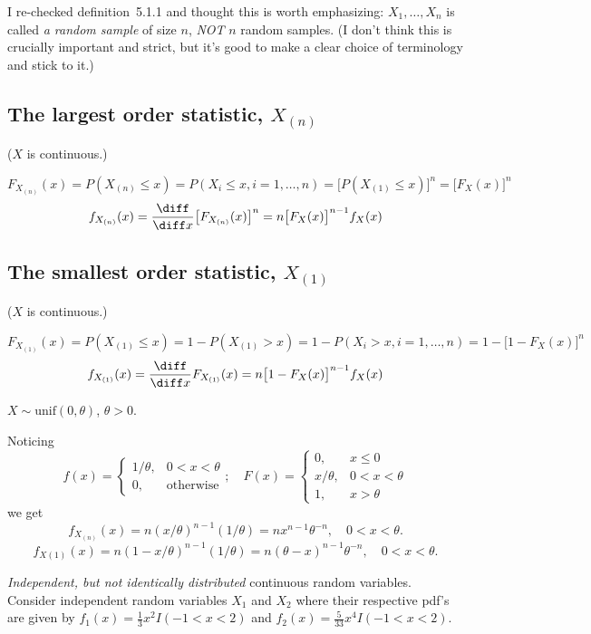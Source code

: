 \documentclass[12pt]{article}
\begin{document}
I re-checked definition~5.1.1 and thought this is worth emphasizing:
$X_1,\dotsc,X_n$ is called \emph{a random sample} of size $n$, \emph{NOT}
$n$ random samples. (I don't think this is crucially important and
strict, but it's good to make a clear choice of terminology and stick to
it.)


\subsection*{The largest order statistic, $X_{(n)}$}

($X$ is continuous.)

\[
F_{X_{(n)}}(x)
= P(X_{(n)} \le x)
= P(X_i \le x, i=1,\dotsc,n)
= \bigl[P(X_{(1)} \le x)\bigr]^n
= \bigl[F_X(x)\bigr]^n
\]
\[
f_{X_{(n)}}(x)
= \frac{\diff}{\diff x} \bigl[F_{X_{(n)}}(x)\bigr]^n
= n\bigl[F_X(x)\bigr]^{n-1} f_X(x)
\]

\subsection*{The smallest order statistic, $X_{(1)}$}

($X$ is continuous.)

\[
F_{X_{(1)}}(x)
= P(X_{(1)} \le x)
= 1 - P(X_{(1)} > x)
= 1 - P(X_i > x, i=1,\dotsc,n)
= 1 - \bigl[1 - F_X(x)\bigr]^n
\]
\[
f_{X_{(1)}}(x)
= \frac{\diff}{\diff x} F_{X_{(1)}}(x)
= n\bigl[1 - F_X(x)\bigr]^{n-1} f_X(x)
\]

\example $X \sim \text{unif}(0,\theta)$, $\theta > 0$.

Noticing
\[
f(x) = \begin{cases}
    1/\theta, & 0<x<\theta\\
    0,        & \text{otherwise}
    \end{cases}
;
\quad
F(x) = \begin{cases}
    0,          & x \le 0\\
    x/\theta,   & 0 < x < \theta\\
    1,          & x > \theta
    \end{cases}
\]
we get
\[
f_{X_{(n)}}(x)
= n (x/\theta)^{n-1} (1/\theta)
= n x^{n-1} \theta^{-n}
,\quad
0<x<\theta.
\]
\[
f_{X{(1)}}(x)
= n (1 - x/\theta)^{n-1} (1/\theta)
= n (\theta - x)^{n-1} \theta^{-n}
,\quad
0<x<\theta.
\]

\example \emph{Independent, but not identically distributed} continuous
random variables.
Consider independent random variables $X_1$ and $X_2$
where their respective pdf's are given by
$f_1(x) = \frac{1}{3}x^2 I(-1<x<2)$ and
$f_2(x) = \frac{5}{33}x^4 I(-1<x<2)$.
\end{document}
